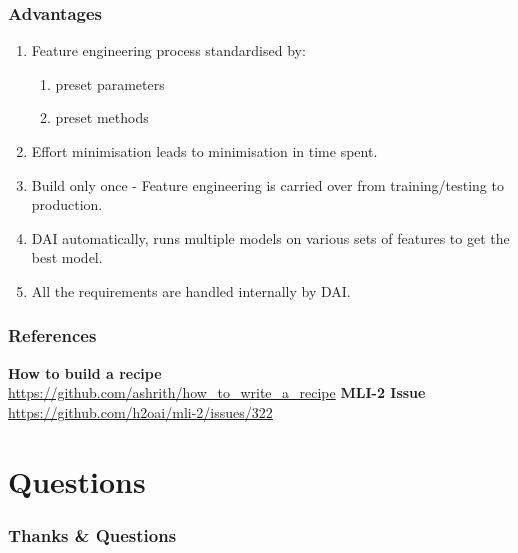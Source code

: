 \documentclass[11pt,
               aspectratio=169,
               hyperref={colorlinks}
               ]{beamer}
\begin{document}
	\begin{frame}
		\frametitle{Advantages}
		\begin{enumerate}
			\item Feature engineering process standardised by:
				\begin{enumerate}
					\item preset parameters
					\item preset methods
				\end{enumerate}
			\item Effort minimisation leads to minimisation in time spent.
			\item Build only once - Feature engineering is carried over from training/testing to production.
			\item DAI automatically, runs multiple models on various sets of features to get the best model. 
			\item All the requirements are handled internally by DAI. 
		\end{enumerate}
\end{frame}

	\begin{frame}[t, allowframebreaks]
	
		\frametitle{References}	
		
			\textbf{How to build a recipe}\\
			\small{\url{https://github.com/ashrith/how_to_write_a_recipe}}
			\textbf{MLI-2 Issue}\\
			\small{\url{https://github.com/h2oai/mli-2/issues/322}}
			
		\framebreak		
		
		\printbibliography
		
	\end{frame}
	\section{Questions}

		\begin{frame}

			\frametitle{Thanks \& Questions}

		\end{frame}

\end{document}
